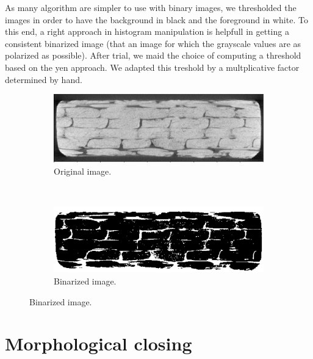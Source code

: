 \documentclass{report}
\begin{document}
As many algorithm are simpler to use with binary images, we thresholded the images in order to have the background in black and the foreground in white.\newline
To this end, a right approach in histogram manipulation is helpfull in getting a consistent binarized image (that an image for which the grayscale values are as polarized as possible).\newline
After trial, we maid the choice of computing a threshold based on the yen approach.
We adapted this treshold by a multplicative factor determined by hand.

\begin{figure}[!h]
\centering
	\begin{subfigure}[b]{0.4\linewidth}
		\centering
		\includegraphics[width=\linewidth]{figures/Thibault/fibres_original.png}
		\caption{Original image.}
	\end{subfigure}
~
	\begin{subfigure}[b]{0.4\linewidth}
		\centering
		\includegraphics[width=\linewidth]{figures/Thibault/fibres_binar.png}
	\caption{Binarized image.}
\end{subfigure}
\label{fig:binar}
\end{figure}

\section{Morphological closing}
\end{document}
